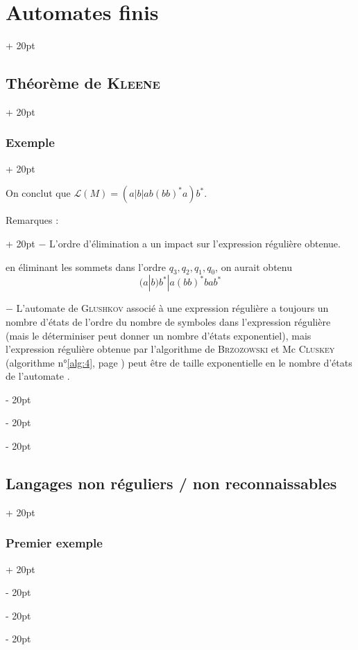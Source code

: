 \documentclass[a4paper, 12pt, twoside]{article}
\newcommand{\ind}[1][20pt]{\advance\leftskip + #1}
\newcommand{\deind}[1][20pt]{\advance\leftskip - #1}
\newenvironment{indt}[2][20pt]{#2 \par \ind[#1]}{\par \deind} %
\begin{document}
\begin{indt}{\section{Automates finis}}
\begin{indt}{\subsection{Théorème de \textsc{Kleene}}}
\begin{indt}{\subsubsection{Exemple}}
\begin{center}
                \end{center}

                \vspace{6pt}
                
                On conclut que $\mathcal L(M) = (a|b|ab(bb)^*a)b^*$.

                \vspace{12pt}
                
                \begin{indt}{Remarques :}
                    $-$ L'ordre d'élimination a un impact sur l'expression régulière obtenue.

                     en éliminant les sommets dans l'ordre $q_3, q_2, q_1, q_0$, on aurait obtenu
                    \[
                        (a|b)b^* | a(bb)^*bab^*
                    \]

                    \vspace{6pt}
                    
                    $-$ L'automate de \textsc{Glushkov} associé à une expression régulière a toujours un nombre d'états de l'ordre du nombre de symboles dans l'expression régulière (mais le déterminiser peut donner un nombre d'états exponentiel), mais l'expression régulière obtenue par l'algorithme de \textsc{Brzozowski} et Mc \textsc{Cluskey} (algorithme n°\ref{alg:4}, page \pageref{alg:4}) peut être de taille exponentielle en le nombre d'états de l'automate .
                \end{indt}
            \end{indt}
        \end{indt}

        \vspace{12pt}
        
        \begin{indt}{\subsection{Langages non réguliers / non reconnaissables}}
            \begin{indt}{\subsubsection{Premier exemple}}
                \label{2.5.1}
                

\end{indt}
\end{indt}
\end{indt}
\end{document}
